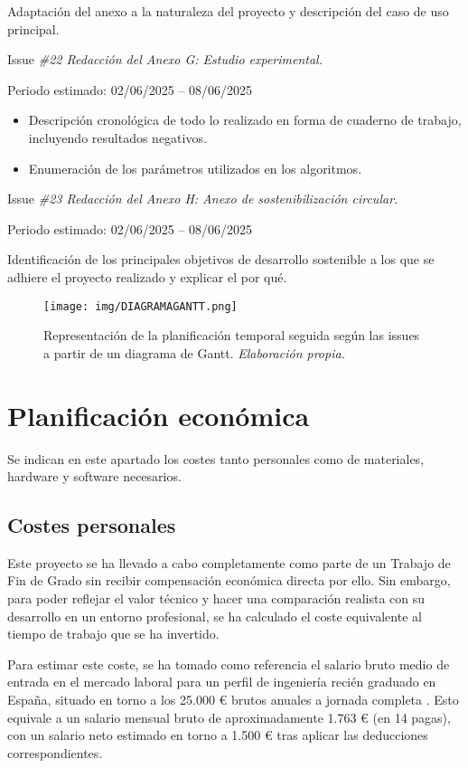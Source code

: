 Adaptación del anexo a la naturaleza del proyecto y descripción del caso de uso principal.


Issue \textit{\#22 Redacción del Anexo G: Estudio experimental.}

Periodo estimado: 02/06/2025 – 08/06/2025

\begin{itemize}
    \item Descripción cronológica de todo lo realizado en forma de cuaderno de trabajo, incluyendo resultados negativos.
    \item Enumeración de los parámetros utilizados en los algoritmos.
\end{itemize}

Issue \textit{\#23 Redacción del Anexo H: Anexo de sostenibilización circular.}

Periodo estimado: 02/06/2025 – 08/06/2025

Identificación de los principales objetivos de desarrollo sostenible a los que se adhiere el proyecto realizado y explicar el por qué.

\begin{figure}[H]
    \centering
    \texttt{[image: img/DIAGRAMAGANTT.png]}
    \caption{Representación de la planificación temporal seguida según las issues a partir de un diagrama de Gantt.\textit{ Elaboración propia.}}
    \label{fig:DIAGRAMAGANTT}
\end{figure}

\section{Planificación económica}
Se indican en este apartado los costes tanto personales como de
materiales, hardware y software necesarios.

\subsection{Costes personales}

Este proyecto se ha llevado a cabo completamente como parte de un Trabajo de Fin de Grado sin recibir compensación económica directa por ello. Sin embargo, para poder reflejar el valor técnico y hacer una comparación realista con su desarrollo en un entorno profesional, se ha calculado el coste equivalente al tiempo de trabajo que se ha invertido.

Para estimar este coste, se ha tomado como referencia el salario bruto medio de entrada en el mercado laboral para un perfil de ingeniería recién graduado en España, situado en torno a los 25.000 € brutos anuales a jornada completa \cite{ufv:salario}. Esto equivale a un salario mensual bruto de aproximadamente 1.763 € (en 14 pagas), con un salario neto estimado en torno a 1.500 € tras aplicar las deducciones correspondientes.

